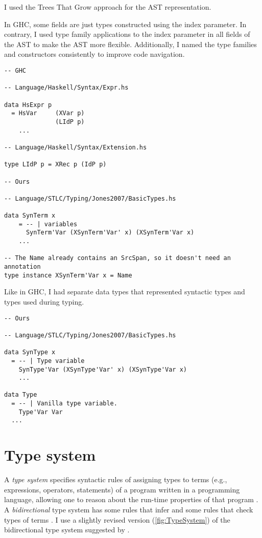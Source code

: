 I used the Trees That Grow approach \cite{trees-that-grow-2016} for the AST representation.

In GHC, some fields are just types constructed using the index parameter. In contrary, I used type family applications to the index parameter in all fields of the AST to make the AST more flexible. Additionally, I named the type families and constructors consistently to improve code navigation.

\begin{verbatim}
-- GHC

-- Language/Haskell/Syntax/Expr.hs

data HsExpr p
  = HsVar     (XVar p)
              (LIdP p)
    ...

-- Language/Haskell/Syntax/Extension.hs

type LIdP p = XRec p (IdP p)

-- Ours

-- Language/STLC/Typing/Jones2007/BasicTypes.hs

data SynTerm x
    = -- | variables
      SynTerm'Var (XSynTerm'Var' x) (XSynTerm'Var x)
    ...

-- The Name already contains an SrcSpan, so it doesn't need an annotation
type instance XSynTerm'Var x = Name
\end{verbatim}

Like in GHC, I had separate data types that represented syntactic types and types used during typing.

\begin{verbatim}
-- Ours

-- Language/STLC/Typing/Jones2007/BasicTypes.hs

data SynType x
  = -- | Type variable
    SynType'Var (XSynType'Var' x) (XSynType'Var x)
    ...

data Type
  = -- | Vanilla type variable.
    Type'Var Var
  ...
\end{verbatim}

\section{Type system}

A \textit{type system} specifies syntactic rules of assigning types to terms (e.g., expressions, operators, statements) of a program written in a programming language, allowing one to reason about the run-time properties of that program \cite{pierce-types-2002}.
A \textit{bidirectional} type system has some rules that infer and some rules that check types of terms \cite{dunfield-bidirectional-2020}.
I use a slightly revised version (\cref{fig:TypeSystem}) of the bidirectional type system suggested by \citeauthor{jones-practical-2007} \cite[Sec. 4.7]{jones-practical-2007}.

